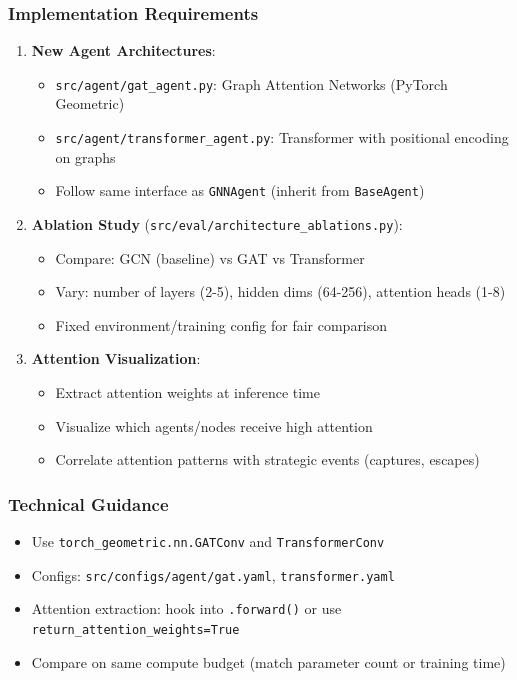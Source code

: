 \documentclass[11pt,a4paper]{scrartcl}
\newcommand{\codepath}[1]{\colorbox{codehighlight}{\texttt{#1}}}
\begin{document}
\subsubsection*{Implementation Requirements}
\begin{enumerate}[leftmargin=1.4em]
    \item \textbf{New Agent Architectures}:
    \begin{itemize}
        \item \codepath{src/agent/gat\_agent.py}: Graph Attention Networks (PyTorch Geometric)
        \item \codepath{src/agent/transformer\_agent.py}: Transformer with positional encoding on graphs
        \item Follow same interface as \texttt{GNNAgent} (inherit from \texttt{BaseAgent})
    \end{itemize}
    
    \item \textbf{Ablation Study} (\codepath{src/eval/architecture\_ablations.py}):
    \begin{itemize}
        \item Compare: GCN (baseline) vs GAT vs Transformer
        \item Vary: number of layers (2-5), hidden dims (64-256), attention heads (1-8)
        \item Fixed environment/training config for fair comparison
    \end{itemize}
    
    \item \textbf{Attention Visualization}:
    \begin{itemize}
        \item Extract attention weights at inference time
        \item Visualize which agents/nodes receive high attention
        \item Correlate attention patterns with strategic events (captures, escapes)
    \end{itemize}
\end{enumerate}

\subsubsection*{Technical Guidance}
\begin{itemize}[leftmargin=1.2em]
    \item Use \texttt{torch\_geometric.nn.GATConv} and \texttt{TransformerConv}
    \item Configs: \codepath{src/configs/agent/gat.yaml}, \codepath{transformer.yaml}
    \item Attention extraction: hook into \texttt{.forward()} or use \texttt{return\_attention\_weights=True}
    \item Compare on same compute budget (match parameter count or training time)
\end{itemize}
\end{document}
